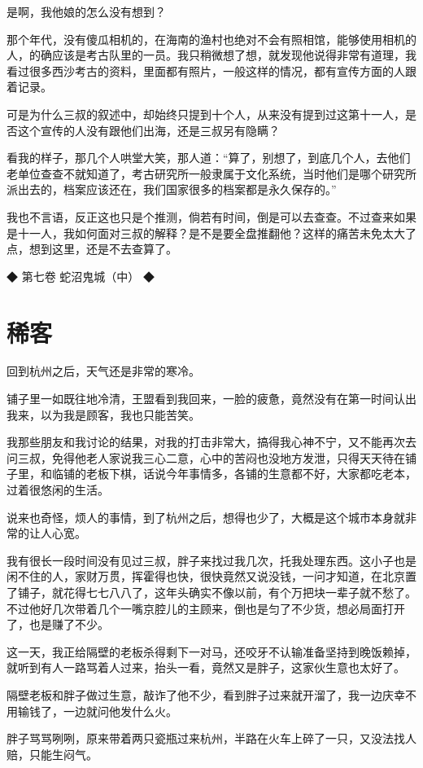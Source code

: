 是啊，我他娘的怎么没有想到？

那个年代，没有傻瓜相机的，在海南的渔村也绝对不会有照相馆，能够使用相机的人，的确应该是考古队里的一员。我只稍微想了想，就发现他说得非常有道理，我看过很多西沙考古的资料，里面都有照片，一般这样的情况，都有宣传方面的人跟着记录。

可是为什么三叔的叙述中，却始终只提到十个人，从来没有提到过这第十一人，是否这个宣传的人没有跟他们出海，还是三叔另有隐瞒？

看我的样子，那几个人哄堂大笑，那人道：“算了，别想了，到底几个人，去他们老单位查查不就知道了，考古研究所一般隶属于文化系统，当时他们是哪个研究所派出去的，档案应该还在，我们国家很多的档案都是永久保存的。”

我也不言语，反正这也只是个推测，倘若有时间，倒是可以去查查。不过查来如果是十一人，我如何面对三叔的解释？是不是要全盘推翻他？这样的痛苦未免太大了点，想到这里，还是不去查算了。

◆ 第七卷 蛇沼鬼城（中） ◆

\chapter{稀客}

回到杭州之后，天气还是非常的寒冷。

铺子里一如既往地冷清，王盟看到我回来，一脸的疲惫，竟然没有在第一时间认出我来，以为我是顾客，我也只能苦笑。

我那些朋友和我讨论的结果，对我的打击非常大，搞得我心神不宁，又不能再次去问三叔，免得他老人家说我三心二意，心中的苦闷也没地方发泄，只得天天待在铺子里，和临铺的老板下棋，话说今年事情多，各铺的生意都不好，大家都吃老本，过着很悠闲的生活。

说来也奇怪，烦人的事情，到了杭州之后，想得也少了，大概是这个城市本身就非常的让人心宽。

我有很长一段时间没有见过三叔，胖子来找过我几次，托我处理东西。这小子也是闲不住的人，家财万贯，挥霍得也快，很快竟然又说没钱，一问才知道，在北京置了铺子，就花得七七八八了，这年头确实不像以前，有个万把块一辈子就不愁了。不过他好几次带着几个一嘴京腔儿的主顾来，倒也是匀了不少货，想必局面打开了，也是赚了不少。

这一天，我正给隔壁的老板杀得剩下一对马，还咬牙不认输准备坚持到晚饭赖掉，就听到有人一路骂着人过来，抬头一看，竟然又是胖子，这家伙生意也太好了。

隔壁老板和胖子做过生意，敲诈了他不少，看到胖子过来就开溜了，我一边庆幸不用输钱了，一边就问他发什么火。

胖子骂骂咧咧，原来带着两只瓷瓶过来杭州，半路在火车上碎了一只，又没法找人赔，只能生闷气。

